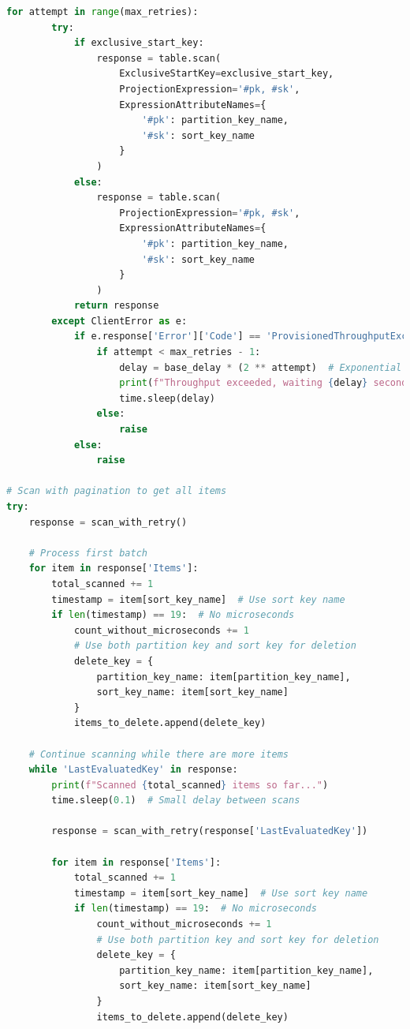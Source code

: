 \begin{lstlisting}[language=Python]
    for attempt in range(max_retries):
        try:
            if exclusive_start_key:
                response = table.scan(
                    ExclusiveStartKey=exclusive_start_key,
                    ProjectionExpression='#pk, #sk',
                    ExpressionAttributeNames={
                        '#pk': partition_key_name, 
                        '#sk': sort_key_name
                    }
                )
            else:
                response = table.scan(
                    ProjectionExpression='#pk, #sk',
                    ExpressionAttributeNames={
                        '#pk': partition_key_name, 
                        '#sk': sort_key_name
                    }
                )
            return response
        except ClientError as e:
            if e.response['Error']['Code'] == 'ProvisionedThroughputExceededException':
                if attempt < max_retries - 1:
                    delay = base_delay * (2 ** attempt)  # Exponential backoff
                    print(f"Throughput exceeded, waiting {delay} seconds...")
                    time.sleep(delay)
                else:
                    raise
            else:
                raise

# Scan with pagination to get all items
try:
    response = scan_with_retry()
    
    # Process first batch
    for item in response['Items']:
        total_scanned += 1
        timestamp = item[sort_key_name]  # Use sort key name
        if len(timestamp) == 19:  # No microseconds
            count_without_microseconds += 1
            # Use both partition key and sort key for deletion
            delete_key = {
                partition_key_name: item[partition_key_name],
                sort_key_name: item[sort_key_name]
            }
            items_to_delete.append(delete_key)
    
    # Continue scanning while there are more items
    while 'LastEvaluatedKey' in response:
        print(f"Scanned {total_scanned} items so far...")
        time.sleep(0.1)  # Small delay between scans
        
        response = scan_with_retry(response['LastEvaluatedKey'])
        
        for item in response['Items']:
            total_scanned += 1
            timestamp = item[sort_key_name]  # Use sort key name
            if len(timestamp) == 19:  # No microseconds
                count_without_microseconds += 1
                # Use both partition key and sort key for deletion
                delete_key = {
                    partition_key_name: item[partition_key_name],
                    sort_key_name: item[sort_key_name]
                }
                items_to_delete.append(delete_key)


\end{lstlisting}

